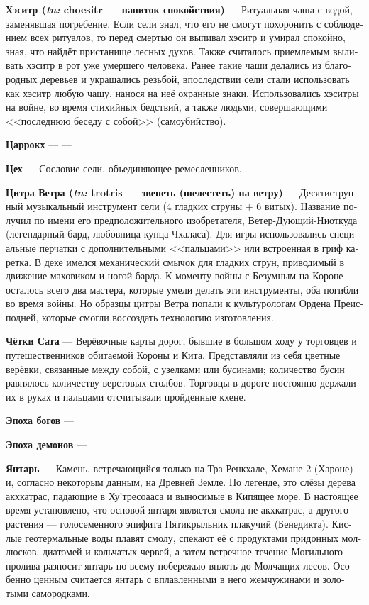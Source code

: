 \documentclass[a4paper,12pt,fleqn]{book}\usepackage{polyglossia}\setdefaultlanguage[babelshorthands=true]{russian}\setotherlanguage{english}\defaultfontfeatures{Ligatures=TeX,Mapping=tex-text}\usepackage{xcolor}\newcommand{\ml}[3]{#2}
\newcommand{\theterm}[3]{\textbf{\hypertarget{#1}{#2}} --- #3}
\newcommand{\theorigin}[3]{\textit{#1:} #2 --- #3}
\begin{document}
{\theterm{choesitr}
{Хэситр (\theorigin{tn}{choesitr}{напиток спокойствия})}
{Ритуальная чаша с водой, заменявшая погребение.
Если сели знал, что его не смогут похоронить с соблюдением всех ритуалов, то перед смертью он выпивал хэситр и умирал спокойно, зная, что найдёт пристанище лесных духов.
Также считалось приемлемым выливать хэситр в рот уже умершего человека.
Ранее такие чаши делались из благородных деревьев и украшались резьбой, впоследствии сели стали использовать как хэситр любую чашу, нанося на неё охранные знаки.
Использовались хэситры на войне, во время стихийных бедствий, а также людьми, совершающими <<последнюю беседу с собой>> (самоубийство).}

\theterm{tesarrokch}
{Царрокх}
{---}

\theterm{workshop}
{Цех}
{Сословие сели, объединяющее ремесленников.}

\theterm{windzither}
{Цитра Ветра (\theorigin{tn}{trotris}{звенеть (шелестеть) на ветру})}
{Десятиструнный музыкальный инструмент сели (4 гладких струны + 6 витых).
Название получил по имени его предположительного изобретателя, Ветер-Дующий-Ниоткуда (легендарный бард, любовница купца Чхаласа).
Для игры использовались специальные перчатки с дополнительными <<пальцами>> или встроенная в гриф каретка.
В деке имелся механический смычок для гладких струн, приводимый в движение маховиком и ногой барда.
К моменту войны с Безумным на Короне осталось всего два мастера, которые умели делать эти инструменты, оба погибли во время войны.
Но образцы цитры Ветра попали к культурологам Ордена Преисподней, которые смогли воссоздать технологию изготовления.}

\theterm{beads-of-sat}
{Чётки Сата}
{Верёвочные карты дорог, бывшие в большом ходу у торговцев и путешественников обитаемой Короны и Кита.
Представляли из себя цветные верёвки, связанные между собой, с узелками или бусинами;
количество бусин равнялось количеству верстовых столбов.
Торговцы в дороге постоянно держали их в руках и пальцами отсчитывали пройденные кхене.}

\theterm{gods-age}
{Эпоха богов}
{}

\theterm{daemons-age}
{Эпоха демонов} %
{}

\theterm{jasper}
{Янтарь}
{Камень, встречающийся только на Тра-Ренкхале, Хемане-2 (Хароне) и, согласно некоторым данным, на Древней Земле.
По легенде, это слёзы дерева акхкатрас, падающие в Ху'тресоааса и выносимые в Кипящее море.
В настоящее время установлено, что основой янтаря является смола не акхкатрас, а другого растения --- голосеменного эпифита Пятикрыльник плакучий (Бенедикта).
Кислые геотермальные воды плавят смолу, спекают её с продуктами придонных моллюсков, диатомей и кольчатых червей, а затем встречное течение Могильного пролива разносит янтарь по всему побережью вплоть до Молчащих лесов.
Особенно ценным считается янтарь с вплавленными в него жемчужинами и золотыми самородками.}

}
\end{document}
